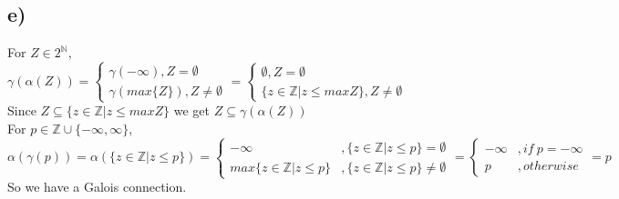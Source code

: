 \documentclass[fleqn,12pt]{article}
\begin{document}
\subsection*{e)}
For $Z\in 2^{\mathbb{N}}$, $\gamma(\alpha(Z)) =
	\begin{cases}
		\gamma(-\infty), Z = \emptyset\\
		\gamma(max\{Z\}), Z \neq \emptyset
	\end{cases}
= 	\begin{cases}
		\emptyset, Z = \emptyset\\
		\{z \in \mathbb{Z}| z \leq max{Z}\}, Z \neq \emptyset
	\end{cases}$\\
Since $Z \subseteq \{z \in \mathbb{Z}| z \leq max{Z} \}$ we get $Z \subseteq \gamma(\alpha(Z))$\\
For $p\in \mathbb{Z}\cup\{-\infty,\infty\}$, $\alpha(\gamma(p)) = \alpha (\{z \in \mathbb{Z} | z \leq p \}) =
	\begin{cases}
	-\infty&, \{z \in \mathbb{Z} | z \leq p \} = \emptyset\\
	max\{z \in \mathbb{Z} | z \leq p \}&, \{z \in \mathbb{Z} | z \leq p \} \neq \emptyset
	\end{cases}
= 	\begin{cases}
	-\infty &, if\ p = -\infty\\
	p &, otherwise
	\end{cases}
= p $
So we have a Galois connection.
\end{document}

